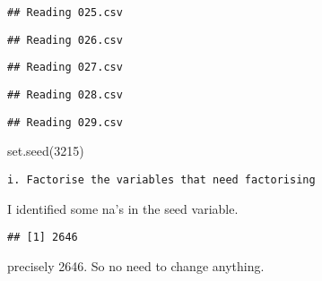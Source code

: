 \documentclass[
]{article}
\newenvironment{Shaded}{\begin{snugshade}}{\end{snugshade}}
\newcommand{\DecValTok}[1]{\textcolor[rgb]{0.00,0.00,0.81}{#1}}
\newcommand{\FunctionTok}[1]{\textcolor[rgb]{0.00,0.00,0.00}{#1}}
\newcommand{\NormalTok}[1]{#1}
\newcommand{\SpecialCharTok}[1]{\textcolor[rgb]{0.00,0.00,0.00}{#1}}
\begin{document}
\begin{verbatim}
## Reading 025.csv
\end{verbatim}

\begin{verbatim}
## Reading 026.csv
\end{verbatim}

\begin{verbatim}
## Reading 027.csv
\end{verbatim}

\begin{verbatim}
## Reading 028.csv
\end{verbatim}

\begin{verbatim}
## Reading 029.csv
\end{verbatim}

\begin{Shaded}
\begin{Highlighting}[]
\FunctionTok{set.seed}\NormalTok{(}\DecValTok{3215}\NormalTok{)}
\end{Highlighting}
\end{Shaded}

\begin{verbatim}
i. Factorise the variables that need factorising  
\end{verbatim}

I identified some na's in the seed variable.

\begin{Shaded}
\end{Shaded}

\begin{verbatim}
## [1] 2646
\end{verbatim}

precisely 2646. So no need to change anything.
\end{document}
